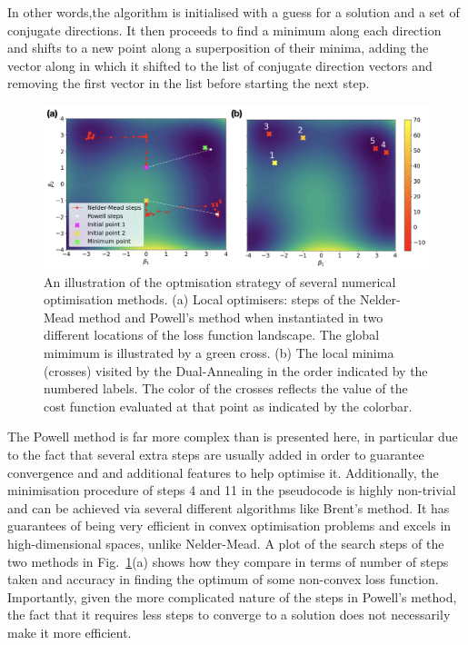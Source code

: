 In other words,the algorithm is initialised with a guess for a solution and a set of conjugate directions. It then proceeds to find a minimum along each direction and shifts to a new point along a superposition of their minima, adding the vector along in which it shifted to the list of conjugate direction vectors and removing the first vector in the list before starting the next step.

\begin{figure}[t]
\centering
\includegraphics[width=\linewidth]{images/optimiser_plots.png} \caption[Visualising optimisers in action]{An illustration of the optmisation strategy of several numerical optimisation methods. (a) Local optimisers: steps of the Nelder-Mead method and Powell's method when instantiated in two different locations of the loss function landscape. The global mimimum is illustrated by a green cross. (b) The local minima (crosses) visited by the Dual-Annealing in the order indicated by the numbered labels. The color of the crosses reflects the value of the cost function evaluated at that point as indicated by the colorbar.}\label{fig:optimisers}
\end{figure}

The Powell method is far more complex than is presented here, in particular due to the fact that several extra steps are usually added in order to guarantee convergence and and additional features to help optimise it. Additionally, the minimisation procedure of steps 4 and 11 in the pseudocode is highly non-trivial and can be achieved via several different algorithms like Brent's method\cite{brent_algorithms_2002}. It has guarantees of being very efficient in convex optimisation problems and excels in high-dimensional spaces, unlike Nelder-Mead. A plot of the search steps of the two methods in Fig.~\ref{fig:optimisers}(a) shows how they compare in terms of number of steps taken and accuracy in finding the optimum of some non-convex loss function. Importantly, given the more complicated nature of the steps in Powell's method, the fact that it requires less steps to converge to a solution does not necessarily make it more efficient.

